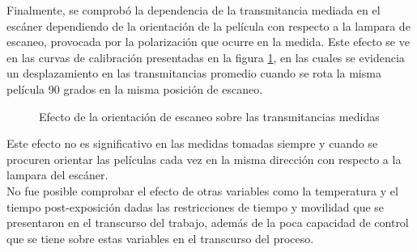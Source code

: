 Finalmente, se comprobó la dependencia de la transmitancia mediada en el escáner dependiendo de la orientación de la película con respecto a la lampara de escaneo, provocada por la polarización que ocurre en la medida. Este efecto se ve en las curvas de calibración presentadas en la figura \ref{fig:efectoOrientacion}, en las cuales se evidencia un desplazamiento en las transmitancias promedio cuando se rota la misma película 90 grados en la misma posición de escaneo.\\
\begin{figure}[H]
	\centering
	\hfill
	\caption{Efecto de la orientación de escaneo sobre las transmitancias medidas}
	\label{fig:efectoOrientacion}
\end{figure}
Este efecto no es significativo en las medidas tomadas siempre y cuando se procuren orientar las películas cada vez en la misma dirección con respecto a la lampara del escáner.\\

No fue posible comprobar el efecto de otras variables como la temperatura y el tiempo post-exposición dadas las restricciones de tiempo y movilidad que se presentaron en el transcurso del trabajo, además de la poca capacidad de control que se tiene sobre estas variables en el transcurso del proceso.\\

